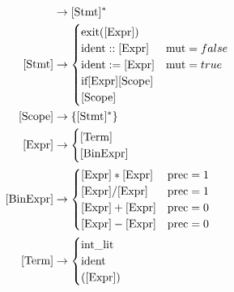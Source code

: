 \begin{align}
    [\text{Prog}] &\to [\text{Stmt}]^* \\
    [\text{Stmt}] &\to
    \begin{cases}
        \text{exit}([\text{Expr}]) \\
        \text{ident} :: [\text{Expr}] & \text{mut} = false \\
        \text{ident} := [\text{Expr}] & \text{mut} = true \\
        \text{if}\space[\text{Expr}]\space[\text{Scope}]\\
        [\text{Scope}]
    \end{cases} \\
    \text{[Scope]} &\to \{[\text{Stmt}]^*\} \\
    [\text{Expr}] &\to
    \begin{cases}
        [\text{Term}] \\
        [\text{BinExpr}]
    \end{cases} \\
    [\text{BinExpr}] &\to
    \begin{cases}
        [\text{Expr}] * [\text{Expr}] & \text{prec} = 1 \\
        [\text{Expr}] / [\text{Expr}] & \text{prec} = 1 \\
        [\text{Expr}] + [\text{Expr}] & \text{prec} = 0 \\
        [\text{Expr}] - [\text{Expr}] & \text{prec} = 0 \\
    \end{cases} \\
    [\text{Term}] &\to
    \begin{cases}
        \text{int\_lit} \\
        \text{ident} \\
        ([\text{Expr}])
    \end{cases} \\
\end{align}
